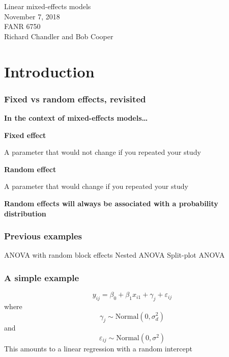 \documentclass[color=usenames,dvipsnames]{beamer}\usepackage[]{graphicx}\usepackage[]{color}
\begin{document}
\begin{frame}[plain]
  \centering \huge
  Linear mixed-effects models \\
  \vspace{1cm}
  \Large
  November 7, 2018 \\
  FANR 6750 \\
  \vfill
  \large
  Richard Chandler and Bob Cooper
\end{frame}


\section{Introduction}



\begin{frame}
  \frametitle{Fixed vs random effects, revisited}
  {\bf In the context of mixed-effects models\dots \par}
  \vspace{0.5cm}
{\bf Fixed effect \par}
A parameter that would not change if you repeated your study

\pause
\vspace{1cm}

{\bf Random effect \par}
A parameter that would change if you repeated your study

\pause
\vfill
{\centering \bf
\alert{Random effects will always be associated with a probability
distribution} \par}
\end{frame}



\begin{frame}
  \frametitle{Previous examples}
  \Large
  ANOVA with random block effects
  \pause
  \vfill
  Nested ANOVA
  \pause
  \vfill
  Split-plot ANOVA
\end{frame}




\begin{frame}
  \frametitle{A simple example}
  \large
  \[
    y_{ij} = \beta_0 + \beta_1 x_{i1} + \gamma_j + \varepsilon_{ij}
  \]
  where
  \[
    \gamma_j \sim \mbox{Normal}(0, \sigma^2_d)
  \]
  and
  \[
    \varepsilon_{ij} \sim \mbox{Normal}(0, \sigma^2)
  \]
  \pause
  \vfill
  \centering
  This amounts to a linear regression with a random intercept \\
\end{frame}
\end{document}
